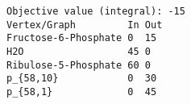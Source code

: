 \begin{verbatim}
Objective value (integral): -15
Vertex/Graph         In Out 
Fructose-6-Phosphate 0  15  
H2O                  45 0   
Ribulose-5-Phosphate 60 0   
p_{58,10}            0  30  
p_{58,1}             0  45  
\end{verbatim}
